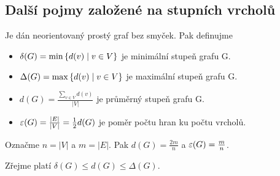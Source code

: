\subsection{Další pojmy založené na stupních vrcholů}
 Je dán neorientovaný prostý graf bez smyček. Pak definujme
\begin{itemize}
    \item $\delta(G) = \min\left\lbrace d(v) \mid v \in V \right\rbrace$ je minimální stupeň grafu G.
    \item $\Delta(G) = \max\left\lbrace d(v) \mid v \in V \right\rbrace$ je maximální stupeň grafu G.
    \item $d(G) = \frac{\sum_{v \in V} d(v)}{|V|}$ je průměrný stupeň grafu G.
    \item $\varepsilon(G) = \frac{|E|}{|V|} = \frac{1}{2}d(G)$ je poměr počtu hran ku počtu vrcholů.
\end{itemize}
Označme $n = |V|$ a $m = |E|$. Pak $d(G) = \frac{2m}{n}$ a $\varepsilon(G) = \frac{m}{n}$. 

Zřejme platí $\delta(G) \leq d(G) \leq \Delta(G)$.